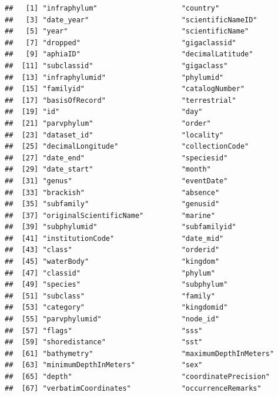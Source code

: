 \documentclass[
]{book}
\begin{document}
\begin{verbatim}
##   [1] "infraphylum"                    "country"                       
##   [3] "date_year"                      "scientificNameID"              
##   [5] "year"                           "scientificName"                
##   [7] "dropped"                        "gigaclassid"                   
##   [9] "aphiaID"                        "decimalLatitude"               
##  [11] "subclassid"                     "gigaclass"                     
##  [13] "infraphylumid"                  "phylumid"                      
##  [15] "familyid"                       "catalogNumber"                 
##  [17] "basisOfRecord"                  "terrestrial"                   
##  [19] "id"                             "day"                           
##  [21] "parvphylum"                     "order"                         
##  [23] "dataset_id"                     "locality"                      
##  [25] "decimalLongitude"               "collectionCode"                
##  [27] "date_end"                       "speciesid"                     
##  [29] "date_start"                     "month"                         
##  [31] "genus"                          "eventDate"                     
##  [33] "brackish"                       "absence"                       
##  [35] "subfamily"                      "genusid"                       
##  [37] "originalScientificName"         "marine"                        
##  [39] "subphylumid"                    "subfamilyid"                   
##  [41] "institutionCode"                "date_mid"                      
##  [43] "class"                          "orderid"                       
##  [45] "waterBody"                      "kingdom"                       
##  [47] "classid"                        "phylum"                        
##  [49] "species"                        "subphylum"                     
##  [51] "subclass"                       "family"                        
##  [53] "category"                       "kingdomid"                     
##  [55] "parvphylumid"                   "node_id"                       
##  [57] "flags"                          "sss"                           
##  [59] "shoredistance"                  "sst"                           
##  [61] "bathymetry"                     "maximumDepthInMeters"          
##  [63] "minimumDepthInMeters"           "sex"                           
##  [65] "depth"                          "coordinatePrecision"           
##  [67] "verbatimCoordinates"            "occurrenceRemarks"             

\end{verbatim}
\end{document}
